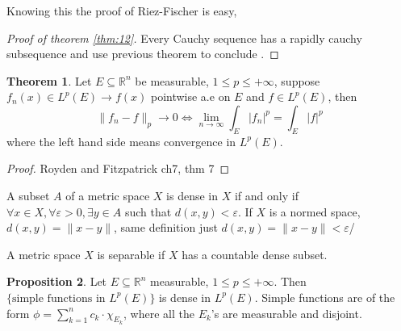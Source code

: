 \documentclass[13pt]{article}
\theoremstyle{definition} --- default
\newtheorem{theorem}{Theorem}
\newtheorem{proposition}[theorem]{Proposition}
\theoremstyle{definition}
\theoremstyle{remark}
\begin{document}
	Knowing this the proof of Riez-Fischer is easy, 
	\begin{proof}[Proof of theorem \ref{thm:12}]
		Every Cauchy sequence has a rapidly cauchy subsequence and use previous theorem to conclude .

	\end{proof}


	\begin{theorem}
		Let $E \subseteq \mathbb{R}^n$ be measurable, $1 \leq p \leq + \infty$, suppose $f_n(x) \in L^p(E) \to f(x)$ pointwise a.e on $E$ and $f \in L^p(E)$, then 
		$$ \|f_n - f\|_p \to 0 \iff \lim_{n \to \infty} \int_{E} |f_n|^p = \int_{E} |f|^p$$
		where the left hand side means convergence in $L^p (E)$.

	\end{theorem}
	\begin{proof}
		Royden and Fitzpatrick ch7, thm 7
	\end{proof}

	A subset $A$ of a metric space $X$ is dense in $X$ if and only if $\forall x \in X, \forall \varepsilon > 0, \exists y \in A$ such that $d(x,y) < \varepsilon$. If $X$ is a normed space, $d(x,y) = \|x-y\|$, same definition just $d(x,y) = \|x-y\| < \varepsilon$/

	A metric space $X$ is separable if $X$ has a countable dense subset.

	\begin{proposition}
		Let $E \subseteq \mathbb{R}^n $ measurable, $1 \leq p \leq + \infty$. Then $\{\text{simple functions in $L^p(E)$}\}$ is dense in $L^p(E)$. Simple functions are of the form $\phi = \sum_{k=1}^n c_k \cdot \chi_{E_k}$, where all the $E_k$'s are measurable and disjoint.
	\end{proposition}
\end{document}
